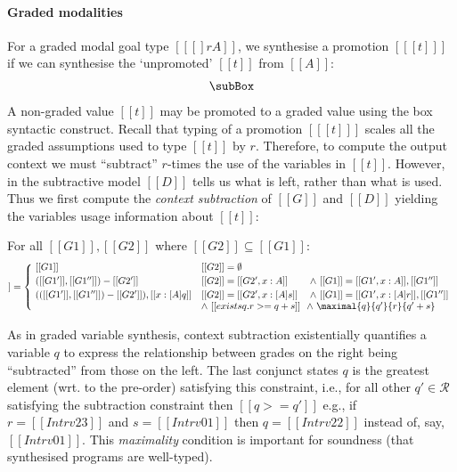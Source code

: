   \paragraph{Graded modalities}
  For a graded modal goal type $[[ [] r A ]]$, we synthesise a promotion
$[[ [ t ] ]]$ if we can synthesise the `unpromoted' $[[t]]$ from $[[A]]$:
  \begin{align*}
    \subBox
    \end{align*}
%
  A non-graded value $[[t]]$ may be promoted to a graded value using
  the box syntactic construct.
  Recall that typing of a promotion $[[ [ t ] ]]$
  scales all the graded assumptions used to type $[[ t ]]$ by $r$. Therefore,
  to compute the output context we must ``subtract'' $r$-times the use of the variables in $[[
  t ]]$. However, in the subtractive model $[[ D ]]$ tells us what is
  left, rather than what is used. Thus we first compute the
  \textit{context subtraction} of $[[G]]$ and $[[D]]$
  yielding the variables usage information about $[[ t ]]$:
  \begin{definition}\label{def:contextSub}
  For all $[[ G1 ]], [[ G2 ]]$ where $ [[G2]] \subseteq [[G1]]$:
\begin{align*}
[[G1 - G2]] =
\left\{\!\begin{matrix}
\begin{array}{lll}
[[G1]]
  & [[G2]] = \emptyset
\\[0.25em]
([[G1']], [[G1'']]) - [[G2']]
  & [[G2]] = [[ G2', x : A]] & \wedge\ [[G1]] = [[G1', x : A]], [[G1'']]
\\[0.25em]
(([[G1']], [[G1'']]) - [[G2']]), [[x : [A] q]]
  & [[ G2]] = [[G2', x : [A] s]] & \wedge\ [[G1]] = [[ G1',x : [A]
                                   r]],[[G1'']] \\[0em]
          & \wedge \ [[ exists q . r >= q + s]]
          & \!\! \wedge \ \maximal{q}{q'}{r}{q' + s}
\end{array}
\end{matrix}\right.
\end{align*}
%
\end{definition}
As in graded variable synthesis, context subtraction existentially quantifies a
variable $q$ to express the relationship
between grades on the right being ``subtracted'' from those on the
left. The last conjunct states
$q$ is the greatest element (wrt.
to the pre-order) satisfying this constraint, i.e., for all
other $q' \in \mathcal{R}$ satisfying the subtraction constraint
then $[[ q >= q']]$ e.g., if $r = [[ Intrv 2 3 ]]$
and $s = [[ Intrv 0 1]]$ then $q = [[ Intrv 2 2 ]]$ instead of, say,
$[[ Intrv 0 1]]$. This \emph{maximality} condition is
important for soundness (that synthesised programs are well-typed).

